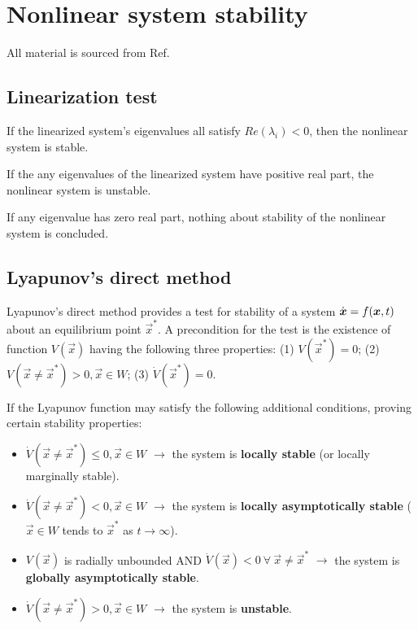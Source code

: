 
\chapter{Nonlinear system stability}

All material is sourced from Ref. \cite{hurtado2015}

\section{Linearization test}

If the linearized system's eigenvalues all satisfy $Re(\lambda_i) < 0$, then the nonlinear system is stable.

If the any eigenvalues of the linearized system have positive real part, the nonlinear system is unstable.

If any eigenvalue has zero real part, nothing about stability of the nonlinear system is concluded.

\section{Lyapunov's direct method}

Lyapunov's direct method provides a test for stability of a system $\dot{\bm{x}} = f(\bm{x},t)$ about an equilibrium point $\vec{x}^*$. A precondition for the test is the existence of function $V(\vec{x})$ having the following three properties: (1) $V(\vec{x}^*) = 0$; (2) $V(\vec{x}\neq \vec{x}^*) > 0, \vec{x}\in W$; (3) $\dot{V}(\vec{x}^*) = 0$.

If the Lyapunov function may satisfy the following additional conditions, proving certain stability properties:

\begin{itemize}
	\item $\dot{V}(\vec{x}\neq\vec{x}^*) \leq 0, \vec{x}\in W$ $\rightarrow$ the system is \textbf{locally stable} (or locally marginally stable).
	\item $\dot{V}(\vec{x}\neq\vec{x}^*) < 0, \vec{x}\in W$ $\rightarrow$ the system is \textbf{locally asymptotically stable} ($\vec{x} \in W$ tends to $\vec{x}^*$ as $t\rightarrow\infty$).
	\item $V(\vec{x})$ is radially unbounded AND $\dot{V}(\vec{x}) < 0 \ \forall \ \vec{x}\neq\vec{x}^*$ $\rightarrow$ the system is \textbf{globally asymptotically stable}.
	\item $\dot{V}(\vec{x}\neq\vec{x}^*) > 0, \vec{x}\in W$ $\rightarrow$ the system is \textbf{unstable}.
\end{itemize}

